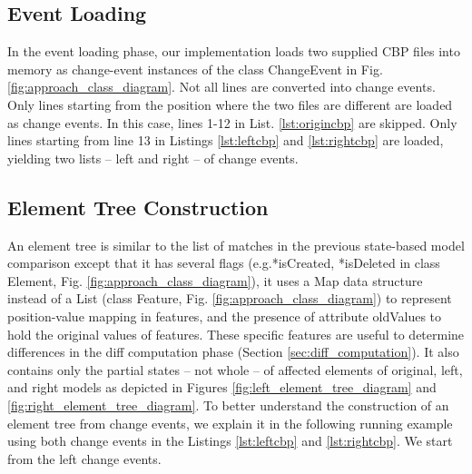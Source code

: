 \documentclass{jot}
\begin{document}
\subsection{Event Loading}
\label{sec:event_loading}
In the event loading phase, our implementation loads two supplied CBP files into memory as change-event instances of the class \textsf{ChangeEvent} in Fig. \ref{fig:approach_class_diagram}. Not all lines are converted into change events. Only lines starting from the position where the two files are different are loaded as change events. In this case, lines 1-12 in List. \ref{lst:origincbp} are skipped. Only lines starting from line 13 in Listings \ref{lst:leftcbp} and \ref{lst:rightcbp} are loaded, yielding two lists -- left and right -- of change events. 

\subsection{Element Tree Construction}
\label{sec:tree_construction}
An element tree is similar to the list of matches in the previous state-based model comparison except that it has several flags (e.g.\textsf{*isCreated}, \textsf{*isDeleted} in class \textsf{Element}, Fig. \ref{fig:approach_class_diagram}), it uses a Map data structure instead of a List (class \textsf{Feature}, Fig. \ref{fig:approach_class_diagram}) to represent position-value mapping in features, and the presence of attribute \textsf{oldValues} to hold the original values of features. These specific features are useful to determine differences in the diff computation phase (Section \ref{sec:diff_computation}). It also contains only the partial states -- not whole -- of affected elements of original, left, and right models as depicted in Figures \ref{fig:left_element_tree_diagram} and \ref{fig:right_element_tree_diagram}. To better understand the construction of an element tree from change events, we explain it in the following running example using both change events in the Listings \ref{lst:leftcbp} and \ref{lst:rightcbp}. We start from the left change events. 
\end{document}
